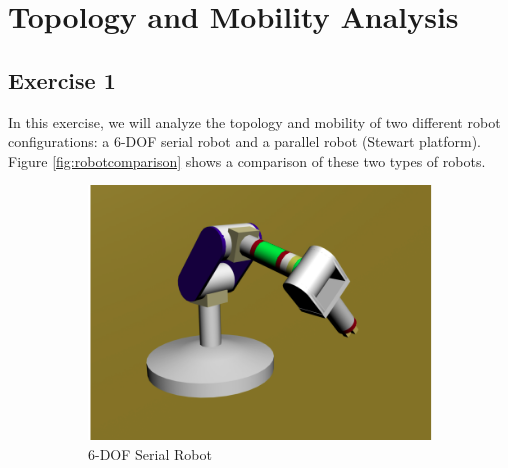 \showchapterboxtrue 
{}


\section{Topology and Mobility Analysis}
\subsection{Exercise 1}
In this exercise, we will analyze the topology and mobility of two different robot configurations: a 6-DOF serial robot and a parallel robot (Stewart platform). Figure \ref{fig:robotcomparison} shows a comparison of these two types of robots.

\begin{figure}[H]
    \centering
    \begin{subfigure}[]{0.45\textwidth}
        \centering
        \includegraphics[width=\textwidth]{6DofSerialRobot}
        \caption{6-DOF Serial Robot}
        \label{fig:6dofserialrobot}
    \end{subfigure}
    \hfill
    \begin{subfigure}[]{0.35\textwidth}
        \centering

\end{subfigure}
\end{figure}
